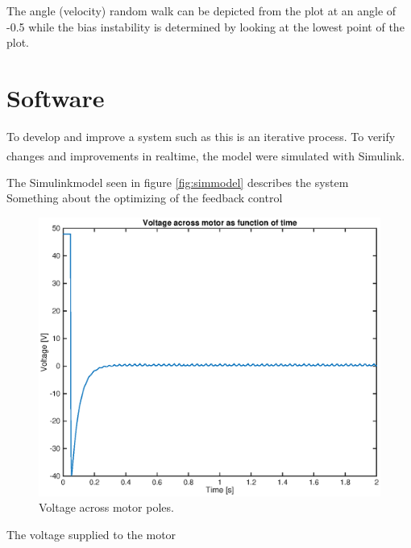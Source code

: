 \documentclass[a4paper,11pt]{kth-mag}
\begin{document}
The angle (velocity) random walk can be depicted from the plot at an angle of -0.5 while the bias instability is determined by looking at the lowest point of the plot.

\section{Software}
To develop and improve a system such as this is an iterative process. To verify changes and improvements in realtime, the model were simulated with Simulink\textsuperscript{\textregistered}. 



The Simulinkmodel seen in figure \ref{fig:simmodel} describes the system
\\ Something about the  optimizing of the feedback control
\begin{figure}[!htb]
\centering
\includegraphics[scale=.7]{voltageplot.eps}
\caption{Voltage across motor poles.}
\label{fig:voltageplot}
\end{figure}

The voltage supplied to the motor
\end{document}
